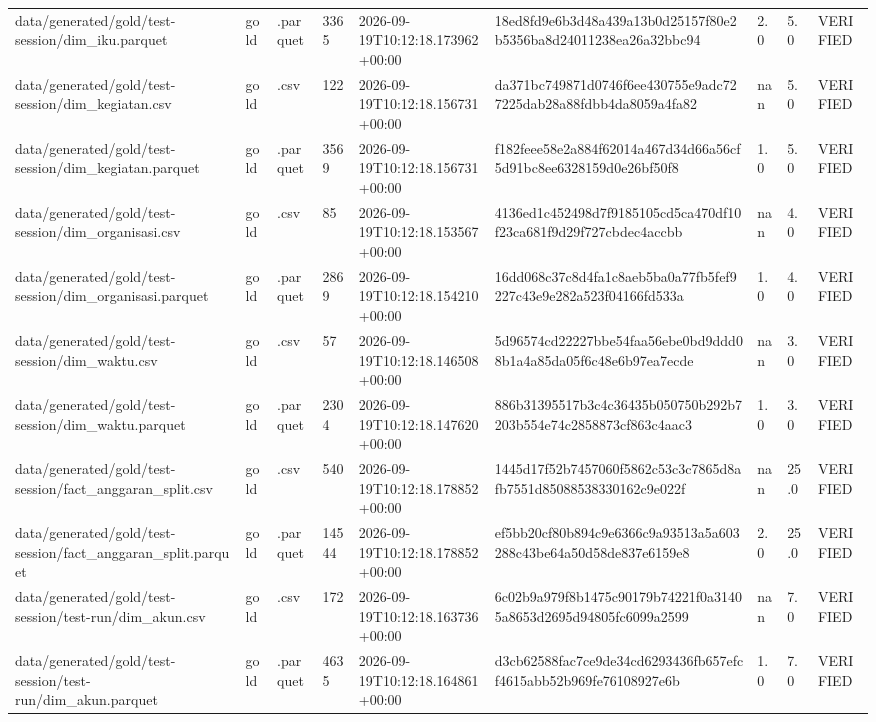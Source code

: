 \begin{longtable}{lllllllll}
data/generated/gold/test-session/dim_iku.parquet & gold & .parquet & 3365 & 2026-09-19T10:12:18.173962+00:00 & 18ed8fd9e6b3d48a439a13b0d25157f80e2b5356ba8d24011238ea26a32bbc94 & 2.0 & 5.0 & VERIFIED \\
data/generated/gold/test-session/dim_kegiatan.csv & gold & .csv & 122 & 2026-09-19T10:12:18.156731+00:00 & da371bc749871d0746f6ee430755e9adc727225dab28a88fdbb4da8059a4fa82 & nan & 5.0 & VERIFIED \\
data/generated/gold/test-session/dim_kegiatan.parquet & gold & .parquet & 3569 & 2026-09-19T10:12:18.156731+00:00 & f182feee58e2a884f62014a467d34d66a56cf5d91bc8ee6328159d0e26bf50f8 & 1.0 & 5.0 & VERIFIED \\
data/generated/gold/test-session/dim_organisasi.csv & gold & .csv & 85 & 2026-09-19T10:12:18.153567+00:00 & 4136ed1c452498d7f9185105cd5ca470df10f23ca681f9d29f727cbdec4accbb & nan & 4.0 & VERIFIED \\
data/generated/gold/test-session/dim_organisasi.parquet & gold & .parquet & 2869 & 2026-09-19T10:12:18.154210+00:00 & 16dd068c37c8d4fa1c8aeb5ba0a77fb5fef9227c43e9e282a523f04166fd533a & 1.0 & 4.0 & VERIFIED \\
data/generated/gold/test-session/dim_waktu.csv & gold & .csv & 57 & 2026-09-19T10:12:18.146508+00:00 & 5d96574cd22227bbe54faa56ebe0bd9ddd08b1a4a85da05f6c48e6b97ea7ecde & nan & 3.0 & VERIFIED \\
data/generated/gold/test-session/dim_waktu.parquet & gold & .parquet & 2304 & 2026-09-19T10:12:18.147620+00:00 & 886b31395517b3c4c36435b050750b292b7203b554e74c2858873cf863c4aac3 & 1.0 & 3.0 & VERIFIED \\
data/generated/gold/test-session/fact_anggaran_split.csv & gold & .csv & 540 & 2026-09-19T10:12:18.178852+00:00 & 1445d17f52b7457060f5862c53c3c7865d8afb7551d85088538330162c9e022f & nan & 25.0 & VERIFIED \\
data/generated/gold/test-session/fact_anggaran_split.parquet & gold & .parquet & 14544 & 2026-09-19T10:12:18.178852+00:00 & ef5bb20cf80b894c9e6366c9a93513a5a603288c43be64a50d58de837e6159e8 & 2.0 & 25.0 & VERIFIED \\
data/generated/gold/test-session/test-run/dim_akun.csv & gold & .csv & 172 & 2026-09-19T10:12:18.163736+00:00 & 6c02b9a979f8b1475c90179b74221f0a31405a8653d2695d94805fc6099a2599 & nan & 7.0 & VERIFIED \\
data/generated/gold/test-session/test-run/dim_akun.parquet & gold & .parquet & 4635 & 2026-09-19T10:12:18.164861+00:00 & d3cb62588fac7ce9de34cd6293436fb657efcf4615abb52b969fe76108927e6b & 1.0 & 7.0 & VERIFIED \\

\end{longtable}
